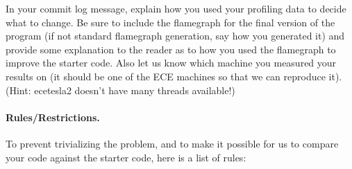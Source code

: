 In your commit log message, explain how you used your profiling data to decide what to change. Be sure to include the flamegraph for the final version of the program (if not standard flamegraph generation, say how you generated it) and provide some explanation to the reader as to how you used the flamegraph to improve the starter code. Also let us know which machine you measured your results on (it should be one of the ECE machines so that we can reproduce it). (Hint: ecetesla2 doesn't have many threads available!)


\paragraph{Rules/Restrictions.} To prevent trivializing the problem, and to make it possible for us to compare your code against the starter code, here is a list of rules:

